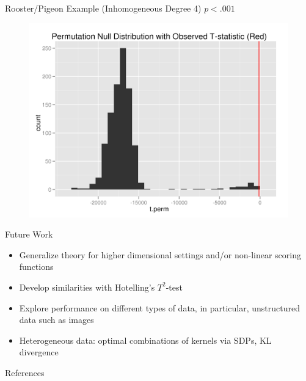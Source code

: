 \documentclass{beamer}
\begin{document}
\begin{frame}{Rooster/Pigeon Example (Inhomogeneous Degree 4)}
  $p < .001$
  \begin{figure}
    \centering
    \includegraphics[scale=.6]{rooster-pigeon-twosamp-4-1.png}
  \end{figure}
\end{frame}

\begin{frame}{Future Work}
  \begin{itemize}
  \item Generalize theory for higher dimensional settings and/or
    non-linear scoring functions \pause
  \item Develop similarities with Hotelling's $T^2$-test \pause
  \item Explore performance on different types of data, in particular,
    unstructured data such as images \pause
  \item Heterogeneous data: optimal combinations of kernels
    via SDPs, KL divergence \pause
  \end{itemize}
\end{frame}

\begin{frame}[allowframebreaks]{References}
  
  
\end{frame}
\end{document}
